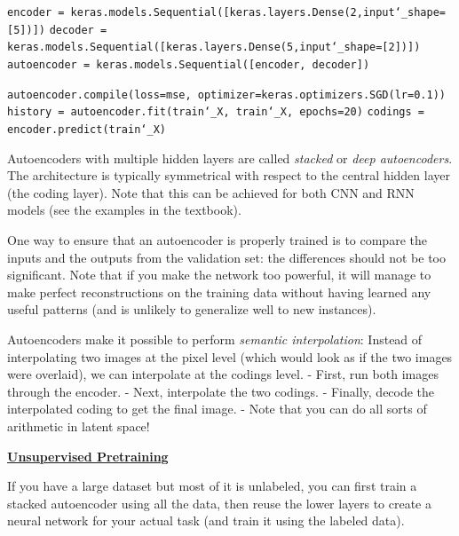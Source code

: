\texttt{encoder = keras.models.Sequential([keras.layers.Dense(2,input\char`_shape=[5])])}\newline
\texttt{decoder = keras.models.Sequential([keras.layers.Dense(5,input\char`_shape=[2])])}\newline
\texttt{autoencoder = keras.models.Sequential([encoder, decoder])}

\texttt{autoencoder.compile(loss=\textquotesingle mse\textquotesingle, optimizer=keras.optimizers.SGD(lr=0.1))}\newline
\texttt{history = autoencoder.fit(train\char`_X, train\char`_X, epochs=20)}\newline
\texttt{codings = encoder.predict(train\char`_X)}

Autoencoders with multiple hidden layers are called \textit{stacked} or \textit{deep autoencoders}.
The architecture is typically symmetrical with respect to the central hidden layer (the coding layer).
Note that this can be achieved for both CNN and RNN models (see the examples in the textbook).

One way to ensure that an autoencoder is properly trained is to compare the inputs and the outputs from the validation set: the differences should not be too significant.
Note that if you make the network too powerful, it will manage to make perfect reconstructions on the training data without having learned any useful patterns
(and is unlikely to generalize well to new instances).

Autoencoders make it possible to perform \textit{semantic interpolation}:\newline
Instead of interpolating two images at the pixel level (which would look as if the two images were overlaid),
we can interpolate at the codings level.\newline
- First, run both images through the encoder.\newline
- Next, interpolate the two codings.\newline
- Finally, decode the interpolated coding to get the final image.\newline
- Note that you can do all sorts of arithmetic in latent space!\newline

\textbf{\underline{Unsupervised Pretraining}}

If you have a large dataset but most of it is unlabeled,
you can first train a stacked autoencoder using all the data,
then reuse the lower layers to create a neural network for your actual task (and train it using the labeled data).

